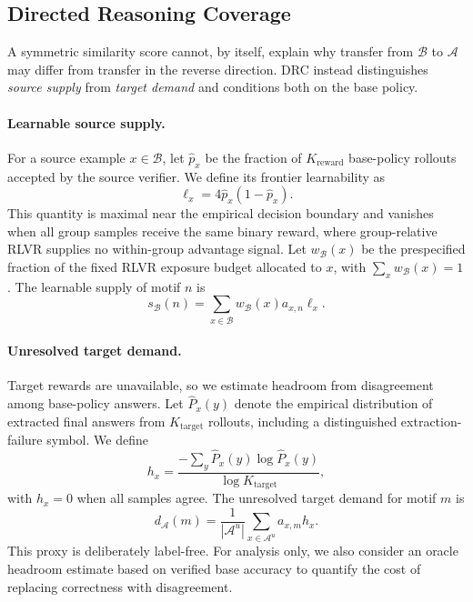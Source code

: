 \subsection{Directed Reasoning Coverage}
\label{sec:drc}

A symmetric similarity score cannot, by itself, explain why transfer from
$\mathcal{B}$ to $\mathcal{A}$ may differ from transfer in the reverse
direction.  DRC instead distinguishes \emph{source supply} from
\emph{target demand} and conditions both on the base policy.

\paragraph{Learnable source supply.}
For a source example $x\in\mathcal{B}$, let $\hat p_x$ be the fraction of
$K_{\mathrm{reward}}$ base-policy rollouts accepted by the source verifier.  We
define its frontier learnability as
\begin{equation}
    \ell_x = 4\hat p_x(1-\hat p_x).
\end{equation}
This quantity is maximal near the empirical decision boundary and vanishes
when all group samples receive the same binary reward, where group-relative
RLVR supplies no within-group advantage signal.  Let
$w_{\mathcal{B}}(x)$ be the prespecified fraction of the fixed RLVR exposure
budget allocated to $x$, with $\sum_x w_{\mathcal{B}}(x)=1$.  The learnable
supply of motif $n$ is
\begin{equation}
    s_{\mathcal{B}}(n)
    = \sum_{x\in\mathcal{B}}
      w_{\mathcal{B}}(x)a_{x,n}\ell_x.
\end{equation}

\paragraph{Unresolved target demand.}
Target rewards are unavailable, so we estimate headroom from disagreement
among base-policy answers.  Let $\widehat P_x(y)$ denote the empirical
distribution of extracted final answers from $K_{\mathrm{target}}$ rollouts,
including a distinguished extraction-failure symbol.  We define
\begin{equation}
    h_x
    = \frac{-\sum_y \widehat P_x(y)\log \widehat P_x(y)}
           {\log K_{\mathrm{target}}},
\end{equation}
with $h_x=0$ when all samples agree.  The unresolved target demand for motif
$m$ is
\begin{equation}
    d_{\mathcal{A}}(m)
    = \frac{1}{|\mathcal{A}^{u}|}
      \sum_{x\in\mathcal{A}^{u}} a_{x,m}h_x.
\end{equation}
This proxy is deliberately label-free.  For analysis only, we also consider an
oracle headroom estimate based on verified base accuracy to quantify the cost
of replacing correctness with disagreement.

